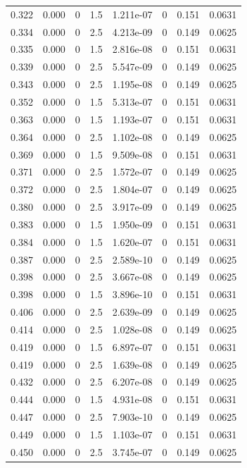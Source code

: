 \documentclass[preview]{standalone}
\begin{document}
{{{\begin{tabular}{L{1.2cm}C{1.2cm} C{0.3cm}C{0.5cm} C{1.4cm}C{1.4cm} C{1.4cm}C{1.4cm}}
  0.322  &  0.000  & 0     & 1.5 &  1.211e-07  & 0  & 0.151 &  0.0631   \\ 
  0.334  &  0.000  & 0     & 2.5 &  4.213e-09  & 0  & 0.149 &  0.0625   \\ 
  0.335  &  0.000  & 0     & 1.5 &  2.816e-08  & 0  & 0.151 &  0.0631   \\ 
  0.339  &  0.000  & 0     & 2.5 &  5.547e-09  & 0  & 0.149 &  0.0625   \\ 
  0.343  &  0.000  & 0     & 2.5 &  1.195e-08  & 0  & 0.149 &  0.0625   \\ 
  0.352  &  0.000  & 0     & 1.5 &  5.313e-07  & 0  & 0.151 &  0.0631   \\ 
  0.363  &  0.000  & 0     & 1.5 &  1.193e-07  & 0  & 0.151 &  0.0631   \\ 
  0.364  &  0.000  & 0     & 2.5 &  1.102e-08  & 0  & 0.149 &  0.0625   \\ 
  0.369  &  0.000  & 0     & 1.5 &  9.509e-08  & 0  & 0.151 &  0.0631   \\ 
  0.371  &  0.000  & 0     & 2.5 &  1.572e-07  & 0  & 0.149 &  0.0625   \\ 
  0.372  &  0.000  & 0     & 2.5 &  1.804e-07  & 0  & 0.149 &  0.0625   \\ 
  0.380  &  0.000  & 0     & 2.5 &  3.917e-09  & 0  & 0.149 &  0.0625   \\ 
  0.383  &  0.000  & 0     & 1.5 &  1.950e-09  & 0  & 0.151 &  0.0631   \\ 
  0.384  &  0.000  & 0     & 1.5 &  1.620e-07  & 0  & 0.151 &  0.0631   \\ 
  0.387  &  0.000  & 0     & 2.5 &  2.589e-10  & 0  & 0.149 &  0.0625   \\ 
  0.398  &  0.000  & 0     & 2.5 &  3.667e-08  & 0  & 0.149 &  0.0625   \\ 
  0.398  &  0.000  & 0     & 1.5 &  3.896e-10  & 0  & 0.151 &  0.0631   \\ 
  0.406  &  0.000  & 0     & 2.5 &  2.639e-09  & 0  & 0.149 &  0.0625   \\ 
  0.414  &  0.000  & 0     & 2.5 &  1.028e-08  & 0  & 0.149 &  0.0625   \\ 
  0.419  &  0.000  & 0     & 1.5 &  6.897e-07  & 0  & 0.151 &  0.0631   \\ 
  0.419  &  0.000  & 0     & 2.5 &  1.639e-08  & 0  & 0.149 &  0.0625   \\ 
  0.432  &  0.000  & 0     & 2.5 &  6.207e-08  & 0  & 0.149 &  0.0625   \\ 
  0.444  &  0.000  & 0     & 1.5 &  4.931e-08  & 0  & 0.151 &  0.0631   \\ 
  0.447  &  0.000  & 0     & 2.5 &  7.903e-10  & 0  & 0.149 &  0.0625   \\ 
  0.449  &  0.000  & 0     & 1.5 &  1.103e-07  & 0  & 0.151 &  0.0631   \\ 
  0.450  &  0.000  & 0     & 2.5 &  3.745e-07  & 0  & 0.149 &  0.0625   \\ 
\hline 
\end{tabular} 

}}}
\end{document}
